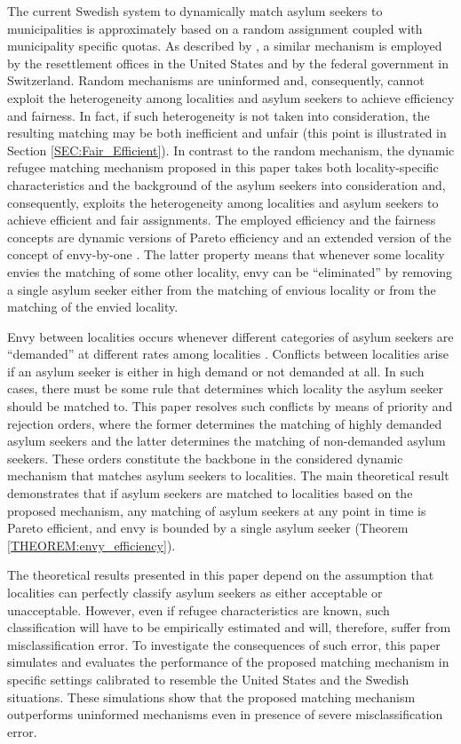 \documentclass[12pt,fleqn]{article}
\begin{document}
The current Swedish system to dynamically match asylum seekers to municipalities is approximately based on a random assignment coupled with municipality specific quotas. As described by \citet[][p.325]{bib:BansakEtAl}, a similar mechanism is employed by the resettlement offices in the United States and by the federal government in Switzerland. Random mechanisms are uninformed and, consequently, cannot exploit the heterogeneity among localities and asylum seekers to achieve efficiency and fairness. In fact, if such heterogeneity is not taken into consideration, the resulting matching may be both inefficient and unfair (this point is illustrated in Section \ref{SEC:Fair_Efficient}). In contrast to the random mechanism, the dynamic refugee matching mechanism proposed in this paper takes both locality-specific characteristics and the background of the asylum seekers into consideration and, consequently, exploits the heterogeneity among localities and asylum seekers to achieve efficient and fair assignments. The employed efficiency and the fairness concepts are dynamic versions of Pareto efficiency and an extended version of the concept of envy-by-one \citep{bib:Budish}. The latter property means that whenever some locality envies the matching of some other locality, envy can be ``eliminated'' by removing a single asylum seeker either from the matching of envious locality or from the matching of the envied locality.

Envy between localities occurs whenever different categories of asylum seekers are ``demanded'' at different rates among localities \citep{bib:BansakEtAl}. Conflicts between localities arise if an asylum seeker is either in high demand or not demanded at all. In such cases, there must be some rule that determines which locality the asylum seeker should be matched to. This paper resolves such conflicts by means of priority and rejection orders, where the former determines the matching of highly demanded asylum seekers and the latter determines the matching of non-demanded asylum seekers. These orders constitute the backbone in the considered dynamic mechanism that matches asylum seekers to localities. The main theoretical result demonstrates that if asylum seekers are matched to localities based on the proposed mechanism, any matching of asylum seekers at any point in time is Pareto efficient, and envy is bounded by a single asylum seeker (Theorem \ref{THEOREM:envy_efficiency}).

The theoretical results presented in this paper depend on the assumption that localities can perfectly classify asylum seekers as either acceptable or unacceptable. However, even if refugee characteristics are known, such classification will have to be empirically estimated and will, therefore, suffer from misclassification error. To investigate the consequences of such error, this paper simulates and evaluates the performance of the proposed matching mechanism in specific settings calibrated to resemble the United States and the Swedish situations. These simulations show that the proposed matching mechanism outperforms uninformed mechanisms even in presence of severe misclassification error.
\end{document}
